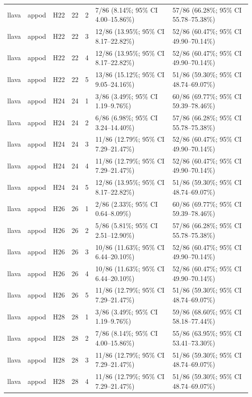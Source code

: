 \begin{longtable}{lllrrll}
llava & appod & H22 & 22 & 2 & 7/86 (8.14\%; 95\% CI 4.00–15.86\%) & 57/86 (66.28\%; 95\% CI 55.78–75.38\%) \\
llava & appod & H22 & 22 & 3 & 12/86 (13.95\%; 95\% CI 8.17–22.82\%) & 52/86 (60.47\%; 95\% CI 49.90–70.14\%) \\
llava & appod & H22 & 22 & 4 & 12/86 (13.95\%; 95\% CI 8.17–22.82\%) & 52/86 (60.47\%; 95\% CI 49.90–70.14\%) \\
llava & appod & H22 & 22 & 5 & 13/86 (15.12\%; 95\% CI 9.05–24.16\%) & 51/86 (59.30\%; 95\% CI 48.74–69.07\%) \\
llava & appod & H24 & 24 & 1 & 3/86 (3.49\%; 95\% CI 1.19–9.76\%) & 60/86 (69.77\%; 95\% CI 59.39–78.46\%) \\
llava & appod & H24 & 24 & 2 & 6/86 (6.98\%; 95\% CI 3.24–14.40\%) & 57/86 (66.28\%; 95\% CI 55.78–75.38\%) \\
llava & appod & H24 & 24 & 3 & 11/86 (12.79\%; 95\% CI 7.29–21.47\%) & 52/86 (60.47\%; 95\% CI 49.90–70.14\%) \\
llava & appod & H24 & 24 & 4 & 11/86 (12.79\%; 95\% CI 7.29–21.47\%) & 52/86 (60.47\%; 95\% CI 49.90–70.14\%) \\
llava & appod & H24 & 24 & 5 & 12/86 (13.95\%; 95\% CI 8.17–22.82\%) & 51/86 (59.30\%; 95\% CI 48.74–69.07\%) \\
llava & appod & H26 & 26 & 1 & 2/86 (2.33\%; 95\% CI 0.64–8.09\%) & 60/86 (69.77\%; 95\% CI 59.39–78.46\%) \\
llava & appod & H26 & 26 & 2 & 5/86 (5.81\%; 95\% CI 2.51–12.90\%) & 57/86 (66.28\%; 95\% CI 55.78–75.38\%) \\
llava & appod & H26 & 26 & 3 & 10/86 (11.63\%; 95\% CI 6.44–20.10\%) & 52/86 (60.47\%; 95\% CI 49.90–70.14\%) \\
llava & appod & H26 & 26 & 4 & 10/86 (11.63\%; 95\% CI 6.44–20.10\%) & 52/86 (60.47\%; 95\% CI 49.90–70.14\%) \\
llava & appod & H26 & 26 & 5 & 11/86 (12.79\%; 95\% CI 7.29–21.47\%) & 51/86 (59.30\%; 95\% CI 48.74–69.07\%) \\
llava & appod & H28 & 28 & 1 & 3/86 (3.49\%; 95\% CI 1.19–9.76\%) & 59/86 (68.60\%; 95\% CI 58.18–77.44\%) \\
llava & appod & H28 & 28 & 2 & 7/86 (8.14\%; 95\% CI 4.00–15.86\%) & 55/86 (63.95\%; 95\% CI 53.41–73.30\%) \\
llava & appod & H28 & 28 & 3 & 11/86 (12.79\%; 95\% CI 7.29–21.47\%) & 51/86 (59.30\%; 95\% CI 48.74–69.07\%) \\
llava & appod & H28 & 28 & 4 & 11/86 (12.79\%; 95\% CI 7.29–21.47\%) & 51/86 (59.30\%; 95\% CI 48.74–69.07\%) \\

\end{longtable}
